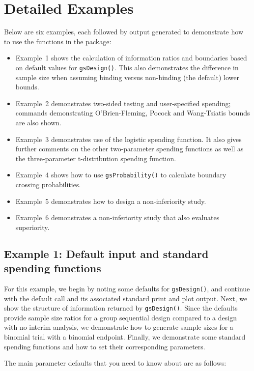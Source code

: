 \section{Detailed Examples\label{sec:detailedex}}

Below are six examples, each followed by output generated to demonstrate how
to use the functions in the package: 
\begin{itemize}
\item Example~1 shows the calculation of
information ratios and boundaries based on default values for
\texttt{gsDesign()}. This also demonstrates the difference in sample size when
assuming binding versus non-binding (the default) lower bounds. 
\item Example~2 demonstrates two-sided testing and user-specified spending; 
commands demonstrating O'Brien-Fleming, Pocock and Wang-Tsiatis bounds are also shown.
\item Example~3 demonstrates use of the logistic spending function. It also 
gives further comments on the other two-parameter spending functions as 
well as the three-parameter t-distribution spending function. 
\item Example~4 shows how to use \texttt{gsProbability()} to calculate 
boundary crossing probabilities. 
\item Example~5 demonstrates how to design a non-inferiority study. 
\item Example~6 demonstrates a non-inferiority study that also evaluates 
superiority.
\end{itemize}

\subsection*{Example 1: Default input and standard spending functions}

For this example, we begin by noting some defaults for \texttt{gsDesign()},
and continue with the default call and its associated standard print and plot
output. Next, we show the structure of information returned by
\texttt{gsDesign()}. Since the defaults provide sample size ratios for a group
sequential design compared to a design with no interim analysis, we
demonstrate how to generate sample sizes for a binomial trial with a binomial
endpoint. Finally, we demonstrate some standard spending functions and how to
set their corresponding parameters.

\bigskip

The main parameter defaults that you need to know about are as follows:

